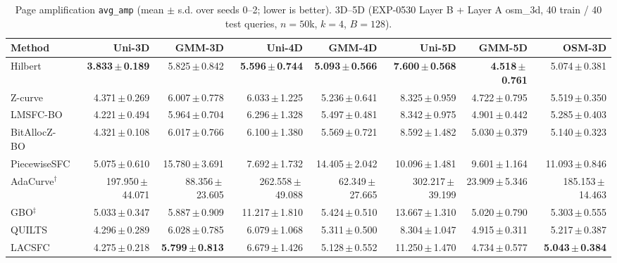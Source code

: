 \begin{table}[t]
\centering\small
\caption{Page amplification \texttt{avg\_amp} (mean $\pm$ s.d. over seeds 0--2; lower is better). 3D--5D (EXP-0530 Layer B + Layer A osm\_3d, 40 train / 40 test queries, $n=50$k, $k=4$, $B=128$).}
\label{tab:exp1110_0530_avg_amp}
\begin{tabular}{lrrrrrrr}
\toprule
Method & Uni-3D & GMM-3D & Uni-4D & GMM-4D & Uni-5D & GMM-5D & OSM-3D \\
\midrule
Hilbert & \textbf{3.833\,$\pm$\,0.189} & 5.825\,$\pm$\,0.842 & \textbf{5.596\,$\pm$\,0.744} & \textbf{5.093\,$\pm$\,0.566} & \textbf{7.600\,$\pm$\,0.568} & \textbf{4.518\,$\pm$\,0.761} & 5.074\,$\pm$\,0.381 \\
Z-curve & 4.371\,$\pm$\,0.269 & 6.007\,$\pm$\,0.778 & 6.033\,$\pm$\,1.225 & 5.236\,$\pm$\,0.641 & 8.325\,$\pm$\,0.959 & 4.722\,$\pm$\,0.795 & 5.519\,$\pm$\,0.350 \\
LMSFC-BO & 4.221\,$\pm$\,0.494 & 5.964\,$\pm$\,0.704 & 6.296\,$\pm$\,1.328 & 5.497\,$\pm$\,0.481 & 8.342\,$\pm$\,0.975 & 4.901\,$\pm$\,0.442 & 5.285\,$\pm$\,0.403 \\
BitAllocZ-BO & 4.321\,$\pm$\,0.108 & 6.017\,$\pm$\,0.766 & 6.100\,$\pm$\,1.380 & 5.569\,$\pm$\,0.721 & 8.592\,$\pm$\,1.482 & 5.030\,$\pm$\,0.379 & 5.140\,$\pm$\,0.323 \\
PiecewiseSFC & 5.075\,$\pm$\,0.610 & 15.780\,$\pm$\,3.691 & 7.692\,$\pm$\,1.732 & 14.405\,$\pm$\,2.042 & 10.096\,$\pm$\,1.481 & 9.601\,$\pm$\,1.164 & 11.093\,$\pm$\,0.846 \\
AdaCurve$^\dagger$ & 197.950\,$\pm$\,44.071 & 88.356\,$\pm$\,23.605 & 262.558\,$\pm$\,49.088 & 62.349\,$\pm$\,27.665 & 302.217\,$\pm$\,39.199 & 23.909\,$\pm$\,5.346 & 185.153\,$\pm$\,14.463 \\
GBO$^\ddagger$ & 5.033\,$\pm$\,0.347 & 5.887\,$\pm$\,0.909 & 11.217\,$\pm$\,1.810 & 5.424\,$\pm$\,0.510 & 13.667\,$\pm$\,1.310 & 5.020\,$\pm$\,0.790 & 5.303\,$\pm$\,0.555 \\
QUILTS & 4.296\,$\pm$\,0.289 & 6.028\,$\pm$\,0.785 & 6.079\,$\pm$\,1.068 & 5.311\,$\pm$\,0.500 & 8.304\,$\pm$\,1.047 & 4.915\,$\pm$\,0.311 & 5.217\,$\pm$\,0.387 \\
LACSFC & 4.275\,$\pm$\,0.218 & \textbf{5.799\,$\pm$\,0.813} & 6.679\,$\pm$\,1.426 & 5.128\,$\pm$\,0.552 & 11.250\,$\pm$\,1.470 & 4.734\,$\pm$\,0.577 & \textbf{5.043\,$\pm$\,0.384} \\
\bottomrule
\end{tabular}
\end{table}

